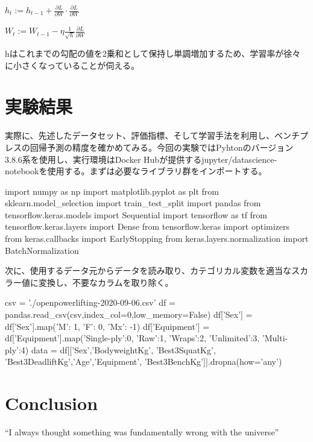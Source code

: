 \documentclass{article}
\begin{document}
\begin{center}
\begin{math}
h_t := h_{t-1} +  \frac{\partial L}{\partial W} \cdot \frac{\partial L}{\partial W}
\end{math}
\end{center}


\begin{center}
\begin{math}
W_t := W_{t-1} - \eta \frac{1}{\sqrt{h}} \frac{\partial L}{\partial W}
\end{math}
\end{center}

hはこれまでの勾配の値を2乗和として保持し単調増加するため、学習率が徐々に小さくなっていることが伺える。


\section{実験結果}

実際に、先述したデータセット、評価指標、そして学習手法を利用し、ベンチプレスの回帰予測の精度を確かめてみる。今回の実験ではPyhtonのバージョン3.8.6系を使用し、実行環境はDocker Hubが提供するjupyter/datascience-notebookを使用する。まずは必要なライブラリ群をインポートする。
\\


\begin{python}
import numpy as np
import matplotlib.pyplot as plt
from sklearn.model_selection import train_test_split
import pandas
from tensorflow.keras.models import Sequential
import tensorflow as tf
from tensorflow.keras.layers import Dense
from tensorflow.keras import optimizers
from keras.callbacks import EarlyStopping
from keras.layers.normalization import BatchNormalization
\end{python}


次に、使用するデータ元からデータを読み取り、カテゴリカル変数を適当なスカラー値に変換し、不要なカラムを取り除く。
\\

\begin{python}
csv = './openpowerlifting-2020-09-06.csv'
df = pandas.read_csv(csv,index_col=0,low_memory=False)
df['Sex'] = df['Sex'].map({'M': 1, 'F': 0, 'Mx': -1})
df['Equipment'] = df['Equipment'].map({'Single-ply':0, 'Raw':1, 'Wraps':2, 'Unlimited':3, 'Multi-ply':4})
data = df[['Sex','BodyweightKg', 'Best3SquatKg', 'Best3DeadliftKg','Age','Equipment', 'Best3BenchKg']].dropna(how='any')
\end{python}


\section{Conclusion}
``I always thought something was fundamentally wrong with the universe'' \citep{adams1995hitchhiker}



\end{document}

